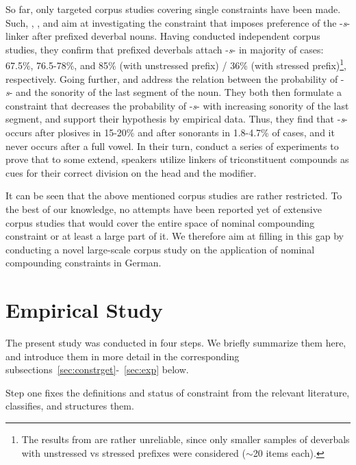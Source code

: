 \documentclass[10pt, a4paper]{article}
\begin{document}
So far, only targeted corpus studies covering single constraints have been made. Such, \citet{kopf_2017}, \citet{kuerschner_2005}, and \citet{nuebling_szczepaniak_2008} aim at investigating the constraint that imposes preference of the -\textit{s}- linker after prefixed deverbal nouns. Having conducted independent corpus studies, they confirm that prefixed deverbals attach -\textit{s}- in majority of cases: 67.5\%, 76.5-78\%, and 85\% (with unstressed prefix) / 36\% (with stressed prefix)\footnote{The results from \citet{nuebling_szczepaniak_2008} are rather unreliable, since only smaller samples of deverbals with unstressed vs stressed prefixes were considered ($\sim$20 items each).}, respectively. Going further, \citet{nuebling_szczepaniak_2008} and \citet{wegener_2005} address the relation between the probability of -\textit{s}- and the sonority of the last segment of the noun. They both then formulate a constraint that decreases the probability of -\textit{s}- with increasing sonority of the last segment, and support their hypothesis by empirical data. Thus, they find that -\textit{s}- occurs after plosives in 15-20\% and after sonorants in 1.8-4.7\% of cases, and it never occurs after a full vowel. In their turn, \citet{krott_etal_2004} conduct a series of experiments to prove that to some extend, speakers utilize linkers of triconstituent compounds as cues for their correct division on the head and the modifier.

It can be seen that the above mentioned corpus studies are rather restricted. To the best of our knowledge, no attempts have been reported yet of extensive corpus studies that would cover the entire space of nominal compounding constraint or at least a large part of it. We therefore aim at filling in this gap by conducting a novel large-scale corpus study on the application of nominal compounding constraints in German.




\section{Empirical Study}
\label{sec:corp}

The present study was conducted in four steps. We briefly summarize them here, and introduce them in more detail in the corresponding subsections~\ref{sec:constrget}-~\ref{sec:exp} below.

Step one fixes the definitions and status of constraint from the relevant literature, classifies, and structures them.
\end{document}
